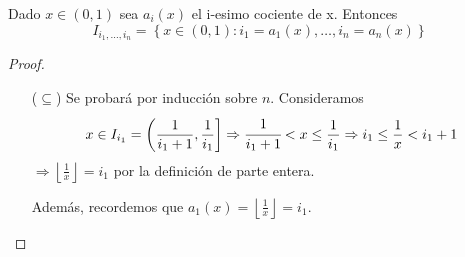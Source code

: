 \begin{prop}
Dado $x \in(0,1)$ sea $a_{i}(x)$ el i-esimo cociente de x. Entonces
$$
I_{i_{1}, \ldots, i_{n}}=\left\{x \in(0,1): i_{1}=a_{1}(x), \ldots, i_{n}=a_{n}(x)\right\}
$$
\label{teo3-2}
\end{prop}
\begin{proof}\hfill
\begin{itemize}
    \item[($\subseteq$)]Se probará por inducción sobre $n$.
    Consideramos
    $$
    x \in I_{i_{1}}=\left(\frac{1}{i_{1}+1}, \frac{1}{i_{1}}\right]\Rightarrow \cfrac{1}{i_{1}+1}<x\leq\frac{1}{i_{1}}\Rightarrow i_{1} \leq \frac{1}{x} < i_{1}+1
    $$
    $\Rightarrow \left\lfloor\frac{1}{x}\right\rfloor = i_{1}$ por la definición de parte entera.
    
    
    Además, recordemos que $a_{1}(x)=\left\lfloor\frac{1}{x}\right\rfloor=i_{1}$.
    

\end{itemize}
\end{proof}
